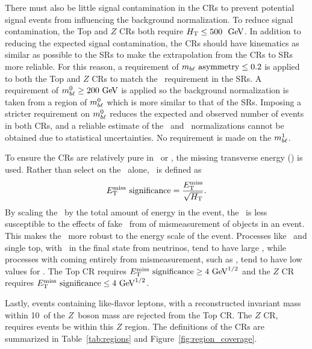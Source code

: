 There must also be little signal contamination in the CRs to prevent potential
signal events from influencing the background normalization.
To reduce signal contamination, the Top and $Z$ CRs both require
$\HT \leq 500~\GeV$.
In addition to reducing the expected signal contamination, the CRs should have
kinematics as similar as possible to the SRs to make the extrapolation from the
CRs to SRs more reliable.
For this reason, a requirement of $m_{b\ell}~\mathrm{asymmetry} \leq 0.2$ is applied to both the
Top and $Z$ CRs to match the \MBLASYM\ requirement in the SRs.
A requirement of $\MBL^0 \geq 200 \GeV$ is applied so the background
normalization is taken from a region of $m_{b\ell}^0$ which is more similar to that
of the SRs.
Imposing a stricter requirement on $m_{b\ell}^0$ reduces the expected and observed
number of events in both CRs, and a reliable estimate of the \TTBAR\ and
\ZGAMMAJETS\ normalizations cannot be obtained due to statistical uncertainties.
No requirement is made on the $m_{b\ell}^1$.

To ensure the CRs are relatively pure in \TTBAR\ or \ZGAMMAJETS, the
missing transverse energy (\MET) is used.
Rather than select on the \MET\ alone, \METSIG\ is defined as
\begin{equation}
  E_{\mathrm{T}}^{\mathrm{miss}}~\text{significance} = \frac{E_{\mathrm{T}}^{\mathrm{miss}}}{\sqrt{H_{\mathrm{T}}}}.
\end{equation}
By scaling the \MET\ by the total amount of energy in the event, the
\METSIG\ is less susceptible to the effects of fake \MET\ from of mismeasurement
of objects in an event.
This makes the \METSIG\ more robust to the energy scale of the event.
Processes like \TTBAR\ and single top, with \MET\ in the final state from
neutrinos, tend
to have large \METSIG, while processes with \MET coming entirely from
mismeasurement, such as \ZGAMMAJETS, tend to have low values for \METSIG.
The Top CR requires $\METSIG \geq 4 \GeV^{1/2}$
and the $Z$ CR requires $\METSIG \leq 4 \GeV^{1/2}$.

Lastly, events containing like-flavor leptons, with a reconstructed invariant
mass within 10~\GeV of the $Z$~boson mass are rejected from the Top CR.
The $Z$ CR, requires events be within this $Z$ region.
The definitions of the CRs are summarized in Table~\ref{tab:regions} and
Figure~\ref{fig:region_coverage}.

